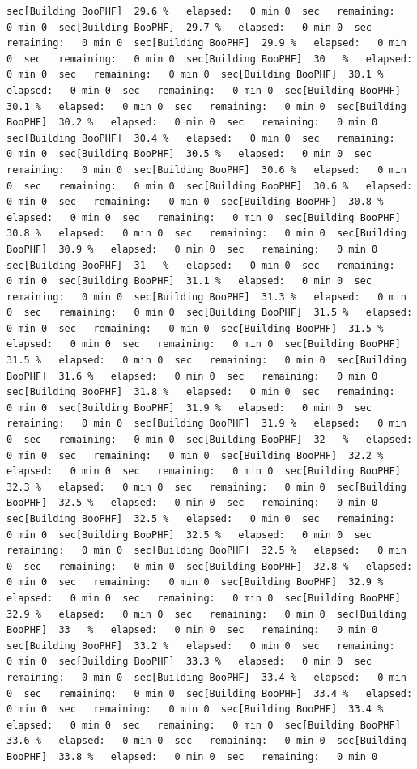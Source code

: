 \documentclass[
]{book}
\begin{document}
\begin{verbatim}
sec[Building BooPHF]  29.6 %   elapsed:   0 min 0  sec   remaining:   0 min 0  sec[Building BooPHF]  29.7 %   elapsed:   0 min 0  sec   remaining:   0 min 0  sec[Building BooPHF]  29.9 %   elapsed:   0 min 0  sec   remaining:   0 min 0  sec[Building BooPHF]  30   %   elapsed:   0 min 0  sec   remaining:   0 min 0  sec[Building BooPHF]  30.1 %   elapsed:   0 min 0  sec   remaining:   0 min 0  sec[Building BooPHF]  30.1 %   elapsed:   0 min 0  sec   remaining:   0 min 0  sec[Building BooPHF]  30.2 %   elapsed:   0 min 0  sec   remaining:   0 min 0  sec[Building BooPHF]  30.4 %   elapsed:   0 min 0  sec   remaining:   0 min 0  sec[Building BooPHF]  30.5 %   elapsed:   0 min 0  sec   remaining:   0 min 0  sec[Building BooPHF]  30.6 %   elapsed:   0 min 0  sec   remaining:   0 min 0  sec[Building BooPHF]  30.6 %   elapsed:   0 min 0  sec   remaining:   0 min 0  sec[Building BooPHF]  30.8 %   elapsed:   0 min 0  sec   remaining:   0 min 0  sec[Building BooPHF]  30.8 %   elapsed:   0 min 0  sec   remaining:   0 min 0  sec[Building BooPHF]  30.9 %   elapsed:   0 min 0  sec   remaining:   0 min 0  sec[Building BooPHF]  31   %   elapsed:   0 min 0  sec   remaining:   0 min 0  sec[Building BooPHF]  31.1 %   elapsed:   0 min 0  sec   remaining:   0 min 0  sec[Building BooPHF]  31.3 %   elapsed:   0 min 0  sec   remaining:   0 min 0  sec[Building BooPHF]  31.5 %   elapsed:   0 min 0  sec   remaining:   0 min 0  sec[Building BooPHF]  31.5 %   elapsed:   0 min 0  sec   remaining:   0 min 0  sec[Building BooPHF]  31.5 %   elapsed:   0 min 0  sec   remaining:   0 min 0  sec[Building BooPHF]  31.6 %   elapsed:   0 min 0  sec   remaining:   0 min 0  sec[Building BooPHF]  31.8 %   elapsed:   0 min 0  sec   remaining:   0 min 0  sec[Building BooPHF]  31.9 %   elapsed:   0 min 0  sec   remaining:   0 min 0  sec[Building BooPHF]  31.9 %   elapsed:   0 min 0  sec   remaining:   0 min 0  sec[Building BooPHF]  32   %   elapsed:   0 min 0  sec   remaining:   0 min 0  sec[Building BooPHF]  32.2 %   elapsed:   0 min 0  sec   remaining:   0 min 0  sec[Building BooPHF]  32.3 %   elapsed:   0 min 0  sec   remaining:   0 min 0  sec[Building BooPHF]  32.5 %   elapsed:   0 min 0  sec   remaining:   0 min 0  sec[Building BooPHF]  32.5 %   elapsed:   0 min 0  sec   remaining:   0 min 0  sec[Building BooPHF]  32.5 %   elapsed:   0 min 0  sec   remaining:   0 min 0  sec[Building BooPHF]  32.5 %   elapsed:   0 min 0  sec   remaining:   0 min 0  sec[Building BooPHF]  32.8 %   elapsed:   0 min 0  sec   remaining:   0 min 0  sec[Building BooPHF]  32.9 %   elapsed:   0 min 0  sec   remaining:   0 min 0  sec[Building BooPHF]  32.9 %   elapsed:   0 min 0  sec   remaining:   0 min 0  sec[Building BooPHF]  33   %   elapsed:   0 min 0  sec   remaining:   0 min 0  sec[Building BooPHF]  33.2 %   elapsed:   0 min 0  sec   remaining:   0 min 0  sec[Building BooPHF]  33.3 %   elapsed:   0 min 0  sec   remaining:   0 min 0  sec[Building BooPHF]  33.4 %   elapsed:   0 min 0  sec   remaining:   0 min 0  sec[Building BooPHF]  33.4 %   elapsed:   0 min 0  sec   remaining:   0 min 0  sec[Building BooPHF]  33.4 %   elapsed:   0 min 0  sec   remaining:   0 min 0  sec[Building BooPHF]  33.6 %   elapsed:   0 min 0  sec   remaining:   0 min 0  sec[Building BooPHF]  33.8 %   elapsed:   0 min 0  sec   remaining:   0 min 0  
\end{verbatim}
\end{document}
